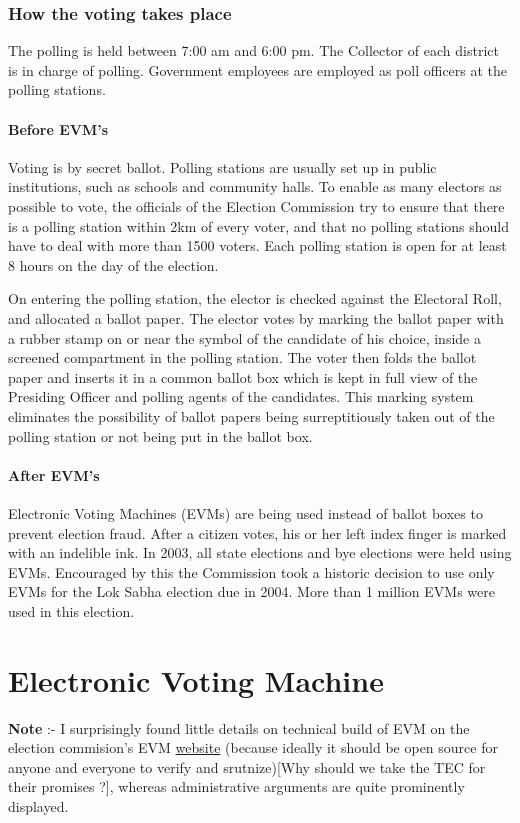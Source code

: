 \documentclass[12pt]{report}
\begin{document}
\subsection{How the voting takes place}

The polling is held between 7:00 am and 6:00 pm. The Collector of each district is in charge of polling. Government employees are employed as poll officers at the polling stations. 

\subsubsection{Before EVM's}
Voting is by secret ballot. Polling stations are usually set up in public institutions, such as schools and community halls. To enable as many electors as possible to vote, the officials of the Election Commission try to ensure that there is a polling station within 2km of every voter, and that no polling stations should have to deal with more than 1500 voters. Each polling station is open for at least 8 hours on the day of the election.

On entering the polling station, the elector is checked against the Electoral Roll, and allocated a ballot paper. The elector votes by marking the ballot paper with a rubber stamp on or near the symbol of the candidate of his choice, inside a screened compartment in the polling station. The voter then folds the ballot paper and inserts it in a common ballot box which is kept in full view of the Presiding Officer and polling agents of the candidates. This marking system eliminates the possibility of ballot papers being surreptitiously taken out of the polling station or not being put in the ballot box.

\subsubsection{After EVM's}
Electronic Voting Machines (EVMs) are being used instead of ballot boxes to prevent election fraud. After a citizen votes, his or her left index finger is marked with an indelible ink.  In 2003, all state elections and bye elections were held using EVMs. Encouraged by this the Commission took a historic decision to use only EVMs for the Lok Sabha election due in 2004. More than 1 million EVMs were used in this election.

\chapter{Electronic Voting Machine}
\textbf{Note} :- I surprisingly found little details on technical build of EVM on the election commision's EVM \hyperref[http://eci.nic.in/eci_main1/evm1.aspx]{website} (because ideally it should be open source for anyone and everyone to verify and srutnize)[Why should we take the TEC for their promises ?], whereas administrative arguments are quite prominently displayed. 
\end{document}
